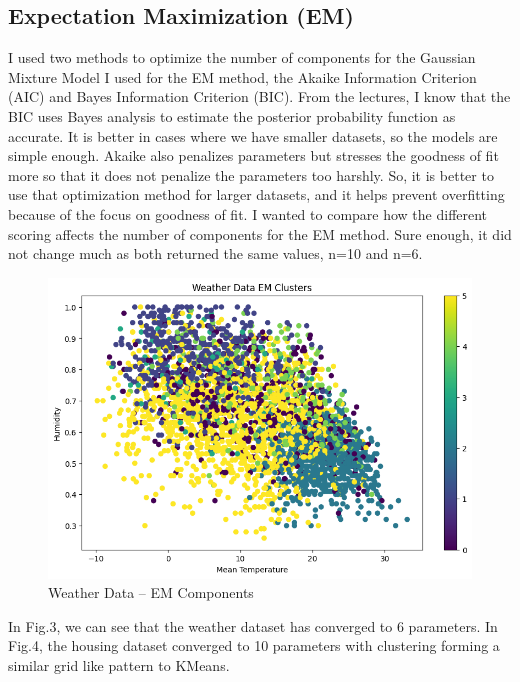 \documentclass[conference]{IEEEtran}
\begin{document}
\subsection{Expectation Maximization (EM)}
\par I used two methods to optimize the number of components for the Gaussian Mixture Model I used for the EM method, the Akaike Information Criterion (AIC) and Bayes Information Criterion (BIC). From the lectures, I know that the BIC uses Bayes analysis to estimate the posterior probability function as accurate. It is better in cases where we have smaller datasets, so the models are simple enough. Akaike also penalizes parameters but stresses the goodness of fit more so that it does not penalize the parameters too harshly. So, it is better to use that optimization method for larger datasets, and it helps prevent overfitting because of the focus on goodness of fit. I wanted to compare how the different scoring affects the number of components for the EM method. Sure enough, it did not change much as both returned the same values, n=10 and n=6.
\begin{figure}
    \centering
    \includegraphics[width=1.0\linewidth]{figures//weather_figures/step_1b.png}
    \caption{Weather Data -- EM Components}
    \label{fig:3_weather_EM
}
\end{figure}
In Fig.3, we can see that the weather dataset has converged to 6 parameters. In Fig.4, the housing dataset converged to 10 parameters with clustering forming a similar grid like pattern to KMeans. 
\end{document}
